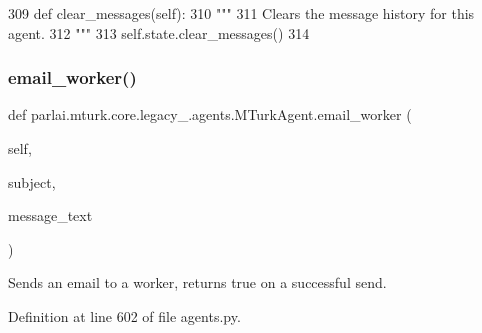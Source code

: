 \begin{DoxyCode}
309     \textcolor{keyword}{def }clear\_messages(self):
310         \textcolor{stringliteral}{"""}
311 \textcolor{stringliteral}{        Clears the message history for this agent.}
312 \textcolor{stringliteral}{        """}
313         self.state.clear\_messages()
314 
\end{DoxyCode}
\mbox{\label{classparlai_1_1mturk_1_1core_1_1legacy__2018_1_1agents_1_1MTurkAgent_ae0ae59f99630aeebb0ef2123711948b3}} 
\subsubsection{\texorpdfstring{email\+\_\+worker()}{email\_worker()}}
{\footnotesize\ttfamily def parlai.\+mturk.\+core.\+legacy\+\_.\+agents.\+M\+Turk\+Agent.\+email\+\_\+worker (\begin{DoxyParamCaption}\item[{}]{self,  }\item[{}]{subject,  }\item[{}]{message\+\_\+text }\end{DoxyParamCaption})}

\begin{DoxyVerb}Sends an email to a worker, returns true on a successful send.
\end{DoxyVerb}
 

Definition at line 602 of file agents.\+py.


